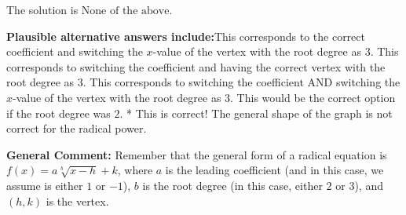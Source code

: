 \documentclass{extbook}[14pt]
\begin{document}
\begin{enumerate}
{The solution is \( \text{None of the above} \).\begin{enumerate}[label=\Alph*.]
\textbf{Plausible alternative answers include:}This corresponds to the correct coefficient and switching the $x$-value of the vertex with the root degree as $3$.
This corresponds to switching the coefficient and having the correct vertex with the root degree as $3$.
This corresponds to switching the coefficient AND switching the $x$-value of the vertex with the root degree as $3$.
This would be the correct option if the root degree was $2$.
* This is correct! The general shape of the graph is not correct for the radical power.
\end{enumerate}

\textbf{General Comment:} Remember that the general form of a radical equation is $ f(x) = a \sqrt[b]{x - h} + k$, where $a$ is the leading coefficient (and in this case, we assume is either $1$ or $-1$), $b$ is the root degree (in this case, either $2$ or $3$), and $(h, k)$ is the vertex.
}
\end{enumerate}
\end{document}
